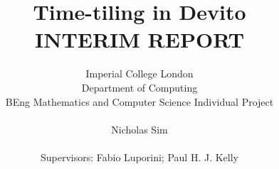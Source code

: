 \documentclass[12pt,a4paper,twoside]{report}
\begin{document}
	\title{Time-tiling in Devito \\\large INTERIM REPORT}
	\author{
		Imperial College London\\
		Department of Computing\\
		BEng Mathematics and Computer Science Individual Project\\\\
		Nicholas Sim\\\\
		Supervisors: Fabio Luporini; Paul H. J. Kelly}
	\maketitle{}

	
	
	\setcounter{page}{4} %
	\tableofcontents{}

	
	
	
	

	\clearpage
	
	
\end{document}
